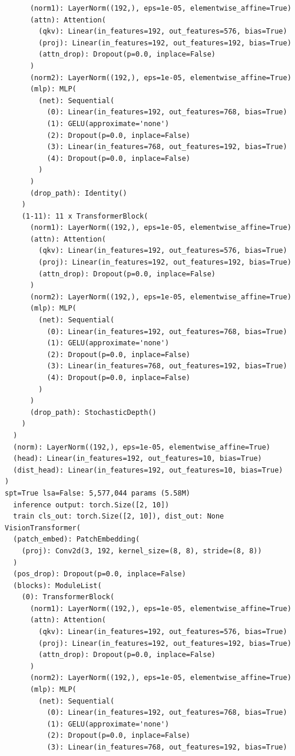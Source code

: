 \documentclass[11pt]{article}
\begin{document}
\begin{verbatim}
      (norm1): LayerNorm((192,), eps=1e-05, elementwise_affine=True)
      (attn): Attention(
        (qkv): Linear(in_features=192, out_features=576, bias=True)
        (proj): Linear(in_features=192, out_features=192, bias=True)
        (attn_drop): Dropout(p=0.0, inplace=False)
      )
      (norm2): LayerNorm((192,), eps=1e-05, elementwise_affine=True)
      (mlp): MLP(
        (net): Sequential(
          (0): Linear(in_features=192, out_features=768, bias=True)
          (1): GELU(approximate='none')
          (2): Dropout(p=0.0, inplace=False)
          (3): Linear(in_features=768, out_features=192, bias=True)
          (4): Dropout(p=0.0, inplace=False)
        )
      )
      (drop_path): Identity()
    )
    (1-11): 11 x TransformerBlock(
      (norm1): LayerNorm((192,), eps=1e-05, elementwise_affine=True)
      (attn): Attention(
        (qkv): Linear(in_features=192, out_features=576, bias=True)
        (proj): Linear(in_features=192, out_features=192, bias=True)
        (attn_drop): Dropout(p=0.0, inplace=False)
      )
      (norm2): LayerNorm((192,), eps=1e-05, elementwise_affine=True)
      (mlp): MLP(
        (net): Sequential(
          (0): Linear(in_features=192, out_features=768, bias=True)
          (1): GELU(approximate='none')
          (2): Dropout(p=0.0, inplace=False)
          (3): Linear(in_features=768, out_features=192, bias=True)
          (4): Dropout(p=0.0, inplace=False)
        )
      )
      (drop_path): StochasticDepth()
    )
  )
  (norm): LayerNorm((192,), eps=1e-05, elementwise_affine=True)
  (head): Linear(in_features=192, out_features=10, bias=True)
  (dist_head): Linear(in_features=192, out_features=10, bias=True)
)
spt=True lsa=False: 5,577,044 params (5.58M)
  inference output: torch.Size([2, 10])
  train cls_out: torch.Size([2, 10]), dist_out: None
VisionTransformer(
  (patch_embed): PatchEmbedding(
    (proj): Conv2d(3, 192, kernel_size=(8, 8), stride=(8, 8))
  )
  (pos_drop): Dropout(p=0.0, inplace=False)
  (blocks): ModuleList(
    (0): TransformerBlock(
      (norm1): LayerNorm((192,), eps=1e-05, elementwise_affine=True)
      (attn): Attention(
        (qkv): Linear(in_features=192, out_features=576, bias=True)
        (proj): Linear(in_features=192, out_features=192, bias=True)
        (attn_drop): Dropout(p=0.0, inplace=False)
      )
      (norm2): LayerNorm((192,), eps=1e-05, elementwise_affine=True)
      (mlp): MLP(
        (net): Sequential(
          (0): Linear(in_features=192, out_features=768, bias=True)
          (1): GELU(approximate='none')
          (2): Dropout(p=0.0, inplace=False)
          (3): Linear(in_features=768, out_features=192, bias=True)

\end{verbatim}
\end{document}
